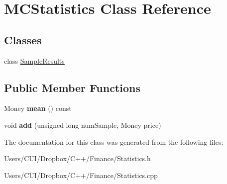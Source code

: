 \hypertarget{class_m_c_statistics}{}\section{M\+C\+Statistics Class Reference}
\label{class_m_c_statistics}
\subsection*{Classes}
\begin{DoxyCompactItemize}
\item 
class \hyperlink{class_m_c_statistics_1_1_sample_results}{Sample\+Results}
\end{DoxyCompactItemize}
\subsection*{Public Member Functions}
\begin{DoxyCompactItemize}
\item 
\hypertarget{class_m_c_statistics_af1aab02cf590dee3fdc6d7b6cf9443fa}{}\label{class_m_c_statistics_af1aab02cf590dee3fdc6d7b6cf9443fa} 
Money {\bfseries mean} () const
\item 
\hypertarget{class_m_c_statistics_a6557ced886141997d13d86777b1970c5}{}\label{class_m_c_statistics_a6557ced886141997d13d86777b1970c5} 
void {\bfseries add} (unsigned long num\+Sample, Money price)
\end{DoxyCompactItemize}


The documentation for this class was generated from the following files\+:\begin{DoxyCompactItemize}
\item 
Users/\+C\+U\+I/\+Dropbox/\+C++/\+Finance/Statistics.\+h\item 
Users/\+C\+U\+I/\+Dropbox/\+C++/\+Finance/Statistics.\+cpp\end{DoxyCompactItemize}
